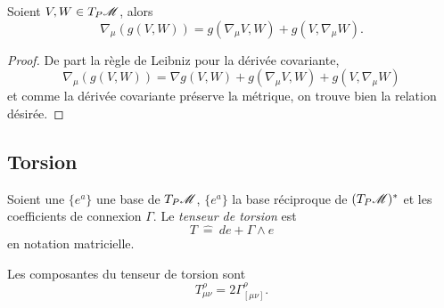 \documentclass[a4paper,11pt]{report}
\begin{document}
                \begin{prop}\begin{leftbar}
                    Soient $V,W\in T_P\mathscr{M}$, alors
                    \begin{equation}
                        \nabla_\mu(g(V,W)) = g(\nabla_\mu V,W) + g(V,\nabla_\mu W).
                    \end{equation}
                \end{leftbar}\end{prop}
                
                \begin{proof}
                    De part la règle de Leibniz pour la dérivée covariante,
                    \begin{equation}
                         \nabla_\mu(g(V,W)) = \nabla g(V,W) + g(\nabla_\mu V,W) + g(V,\nabla_\mu W)
                    \end{equation}
                    et comme la dérivée covariante préserve la métrique, on trouve bien la relation désirée.
                \end{proof}
            
            \subsection{Torsion}
            
                \begin{defn}
                    Soient une $\{e^a\}$ une base de $T_P\mathscr{M}$, $\{e^a\}$ la base réciproque de $(T_P\mathscr{M})^*$ et les coefficients de connexion $\Gamma$. Le \textit{tenseur de torsion} est
                    \begin{equation}
                        T ~\hat{=}~ de+\Gamma\wedge e
                    \end{equation}
                    en notation matricielle.
                \end{defn}
                
                \begin{prop}\begin{leftbar}
                    Les composantes du tenseur de torsion sont
                    \begin{equation}
                        T^\rho_{\mu\nu} = 2\Gamma^\rho_{[\mu\nu]}.
                    \end{equation}
                \end{leftbar}\end{prop}
                
\end{document}
